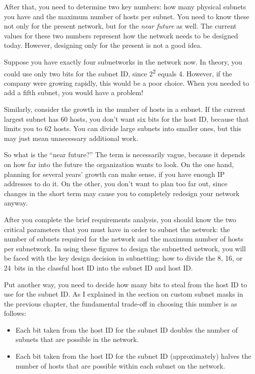 After that, you need to determine two key numbers: how many physical
subnets you have and the maximum number of hosts per subnet. You need to
know these not only for the present network, but for the {\emph{near
future}} as well. The current values for these two numbers represent how
the network needs to be designed today. However, designing only for the
present is not a good idea.

Suppose you have exactly four subnetworks in the network now. In theory,
you could use only two bits for the subnet ID, since
2\textsuperscript{2} equals 4. However, if the company were growing
rapidly, this would be a poor choice. When you needed to add a fifth
subnet, you would have a problem!

Similarly, consider the growth in the number of hosts in a subnet. If
the current largest subnet has 60 hosts, you don't want six bits for the
host ID, because that limits you to 62 hosts. You can divide large
subnets into smaller ones, but this may just mean unnecessary additional
work.

So what is the ``near future?''
The term is necessarily vague, because it depends on how far into the future the organization wants to look.
On the one hand, planning for several years' growth can make sense, if you
have enough IP addresses to do it. On the other, you don't want to plan
too far out, since changes in the short term may cause you to completely redesign your network anyway.

After you complete the brief requirements analysis, you should know the
two critical parameters that you must have in order to subnet the
network: the number of subnets required for the network and the maximum
number of hosts per subnetwork. In using these figures to design the
subnetted network, you will be faced with the key design decision in
subnetting: how to divide the 8, 16, or 24~bits in the classful host ID
into the subnet ID and host ID.

Put another way, you need to decide how many bits to steal from the host
ID to use for the subnet ID. As I explained in the section on custom
subnet masks in the previous chapter, the fundamental trade-off in
choosing this number is as follows:

\begin{itemize}
   \item
   Each bit taken from the host ID for the subnet ID doubles the number of subnets that are possible in the network.
   \item
   Each bit taken from the host ID for the subnet ID (approximately) halves the number of hosts that are possible within each subnet on the network.
\end{itemize}


